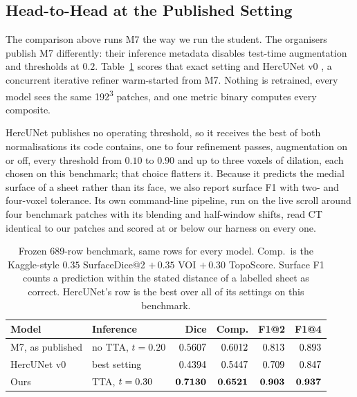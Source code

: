 \subsection{Head-to-Head at the Published Setting}
\label{sec:head-to-head}

The comparison above runs M7 the way we run the student. The organisers
publish M7 differently: their inference metadata disables test-time
augmentation and thresholds at $0.2$. Table~\ref{tab:h2h} scores that exact
setting and HercUNet v0 \cite{lomeli2026hercunet}, a concurrent iterative
refiner warm-started from M7. Nothing is retrained, every model sees the same
192\textsuperscript{3} patches, and one metric binary computes every composite.

HercUNet publishes no operating threshold, so it receives the best of both
normalisations its code contains, one to four refinement passes, augmentation
on or off, every threshold from $0.10$ to $0.90$ and up to three voxels of
dilation, each chosen on this benchmark; that choice flatters it. Because it
predicts the medial surface of a sheet rather than its face, we also report
surface F1 with two- and four-voxel tolerance. Its own command-line pipeline,
run on the live scroll around four benchmark patches with its blending and
half-window shifts, read CT identical to our patches and scored at or below our
harness on every one.

\begin{table}[t]
\caption{Frozen 689-row benchmark, same rows for every model. Comp.\ is the
Kaggle-style $0.35$ SurfaceDice@2 $+\,0.35$ VOI $+\,0.30$ TopoScore. Surface F1
counts a prediction within the stated distance of a labelled sheet as correct.
HercUNet's row is the best over all of its settings on this benchmark.}
\label{tab:h2h}
\centering
\small
\setlength{\tabcolsep}{4pt}
\begin{tabular}{llrrrr}
\toprule
Model & Inference & Dice & Comp. & F1@2 & F1@4 \\
\midrule
M7, as published & no TTA, $t=0.20$ & $0.5607$ & $0.6012$ & $0.813$ & $0.893$ \\
HercUNet v0 & best setting & $0.4394$ & $0.5447$ & $0.709$ & $0.847$ \\
Ours & TTA, $t=0.30$ & $\mathbf{0.7130}$ & $\mathbf{0.6521}$ & $\mathbf{0.903}$ & $\mathbf{0.937}$ \\
\bottomrule
\end{tabular}
\end{table}

